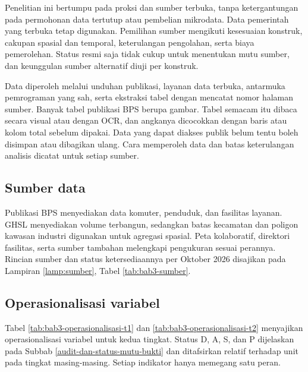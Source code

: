 \documentclass[12pt,a4paper,oneside,openany,indonesian]{report}
\begin{document}
Penelitian ini bertumpu pada proksi dan sumber terbuka, tanpa
ketergantungan pada permohonan data tertutup atau pembelian mikrodata.
Data pemerintah yang terbuka tetap digunakan. Pemilihan sumber mengikuti
kesesuaian konstruk, cakupan spasial dan temporal, keterulangan
pengolahan, serta biaya pemerolehan. Status resmi saja tidak cukup
untuk menentukan mutu sumber, dan keunggulan sumber alternatif diuji per
konstruk.

Data diperoleh melalui unduhan publikasi, layanan data terbuka,
antarmuka pemrograman yang sah, serta ekstraksi tabel dengan mencatat
nomor halaman sumber. Banyak tabel publikasi BPS
berupa gambar. Tabel semacam itu dibaca secara visual atau dengan OCR,
dan angkanya dicocokkan dengan baris atau kolom total sebelum dipakai.
Data yang dapat diakses publik belum tentu boleh disimpan atau
dibagikan ulang. Cara memperoleh data dan batas keterulangan analisis
dicatat untuk setiap sumber.

\subsection{Sumber data}\label{kelompok-sumber-dan-konstruksi-data}

Publikasi BPS menyediakan data komuter, penduduk, dan fasilitas layanan.
GHSL menyediakan volume terbangun, sedangkan batas kecamatan dan
poligon kawasan industri digunakan untuk agregasi spasial. Peta
kolaboratif, direktori fasilitas, serta sumber tambahan melengkapi
pengukuran sesuai perannya. Rincian sumber dan status ketersediaannya
per Oktober 2026 disajikan pada Lampiran \ref{lamp:sumber}, Tabel
\ref{tab:bab3-sumber}.



\subsection{Operasionalisasi variabel}\label{operasionalisasi-variabel}

Tabel \ref{tab:bab3-operasionalisasi-t1} dan
\ref{tab:bab3-operasionalisasi-t2} menyajikan operasionalisasi variabel
untuk kedua tingkat. Status D, A, S, dan P dijelaskan pada Subbab
\ref{audit-dan-status-mutu-bukti} dan ditafsirkan relatif terhadap unit pada
tingkat masing-masing. Setiap indikator hanya memegang satu peran.
\end{document}
